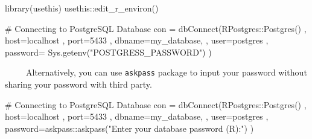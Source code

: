 \documentclass[
  letterpaper,
  DIV=11,
  numbers=noendperiod]{scrreprt}
\newenvironment{Shaded}{\begin{snugshade}}{\end{snugshade}}
\newcommand{\AttributeTok}[1]{\textcolor[rgb]{0.40,0.45,0.13}{#1}}
\newcommand{\CommentTok}[1]{\textcolor[rgb]{0.37,0.37,0.37}{#1}}
\newcommand{\FunctionTok}[1]{\textcolor[rgb]{0.28,0.35,0.67}{#1}}
\newcommand{\NormalTok}[1]{\textcolor[rgb]{0.00,0.23,0.31}{#1}}
\newcommand{\OtherTok}[1]{\textcolor[rgb]{0.00,0.23,0.31}{#1}}
\newcommand{\SpecialCharTok}[1]{\textcolor[rgb]{0.37,0.37,0.37}{#1}}
\newcommand{\StringTok}[1]{\textcolor[rgb]{0.13,0.47,0.30}{#1}}
\begin{document}
\begin{Shaded}
\begin{Highlighting}[]
\FunctionTok{library}\NormalTok{(usethis)}
\NormalTok{usethis}\SpecialCharTok{::}\FunctionTok{edit\_r\_environ}\NormalTok{()}
\end{Highlighting}
\end{Shaded}

\begin{Shaded}
\begin{Highlighting}[]
\CommentTok{\# Connecting to PostgreSQL Database }
\NormalTok{con }\OtherTok{=} \FunctionTok{dbConnect}\NormalTok{(RPostgres}\SpecialCharTok{::}\FunctionTok{Postgres}\NormalTok{()}
\NormalTok{                 , }\AttributeTok{host=}\StringTok{\textquotesingle{}localhost\textquotesingle{}}
\NormalTok{                 , }\AttributeTok{port=}\StringTok{\textquotesingle{}5433\textquotesingle{}}
\NormalTok{                 , }\AttributeTok{dbname=}\StringTok{\textquotesingle{}my\_database\textquotesingle{}}\NormalTok{,}
\NormalTok{                 , }\AttributeTok{user=}\StringTok{\textquotesingle{}postgres\textquotesingle{}}
\NormalTok{                 , }\AttributeTok{password=} \FunctionTok{Sys.getenv}\NormalTok{(}\StringTok{"POSTGRESS\_PASSWORD"}\NormalTok{)}
\NormalTok{                 )}
\end{Highlighting}
\end{Shaded}

~~~~~Alternatively, you can use \texttt{askpass} package to input your
password without sharing your password with third party.

\begin{Shaded}
\begin{Highlighting}[]
\CommentTok{\# Connecting to PostgreSQL Database }
\NormalTok{con }\OtherTok{=} \FunctionTok{dbConnect}\NormalTok{(RPostgres}\SpecialCharTok{::}\FunctionTok{Postgres}\NormalTok{()}
\NormalTok{                 , }\AttributeTok{host=}\StringTok{\textquotesingle{}localhost\textquotesingle{}}
\NormalTok{                 , }\AttributeTok{port=}\StringTok{\textquotesingle{}5433\textquotesingle{}}
\NormalTok{                 , }\AttributeTok{dbname=}\StringTok{\textquotesingle{}my\_database\textquotesingle{}}\NormalTok{,}
\NormalTok{                 , }\AttributeTok{user=}\StringTok{\textquotesingle{}postgres\textquotesingle{}}
\NormalTok{                 , }\AttributeTok{password=}\NormalTok{askpass}\SpecialCharTok{::}\FunctionTok{askpass}\NormalTok{(}\StringTok{"Enter your database password (R):"}\NormalTok{)}
\NormalTok{                 )}
\end{Highlighting}
\end{Shaded}
\end{document}
